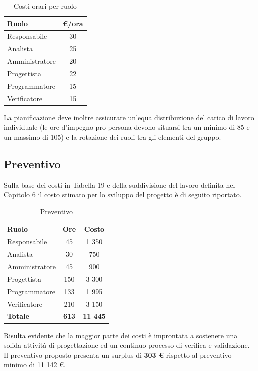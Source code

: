 \documentclass[a4paper,11pt]{article}
\begin{document}
	\begin{table}[h!]
	\begin{center}
		\begin{tabularx}{150pt}{Xc}
			\textbf{Ruolo} & \textbf{\euro/ora}\\
			\midrule
			Responsabile & 30 \\
			Analista & 25 \\
			Amministratore & 20 \\
			Progettista & 22 \\
			Programmatore & 15 \\
			Verificatore & 15 \\
			\midrule
		\end{tabularx}
		\end{center}
	\caption{Costi orari per ruolo}
	\end{table}
	
La pianificazione deve inoltre assicurare un'equa distribuzione del carico di lavoro individuale (le ore d'impegno pro persona devono situarsi tra un minimo di 85 e un massimo di 105) e la rotazione dei ruoli tra gli elementi del gruppo.
	\subsection{Preventivo}
	Sulla base dei costi in Tabella 19 e della suddivisione del lavoro definita nel Capitolo 6 il costo stimato per lo sviluppo del progetto è di seguito riportato.
	\begin{table}[h!]
	\begin{center}
		\begin{tabular}{l c c}
			\textbf{Ruolo} & \textbf{Ore} & \textbf{Costo}\\
			\midrule
			Responsabile & 45 & 1 350\\
			Analista & 30 & 750\\
			Amministratore & 45 & 900\\
			Progettista & 150 & 3 300\\
			Programmatore & 133 & 1 995\\
			Verificatore & 210 & 3 150\\
			\midrule
			\textbf{Totale} & \textbf{613} & \textbf{11 445}
		\end{tabular}
		\end{center}
	\caption{Preventivo}
	\end{table}
	
	Risulta evidente che la maggior parte dei costi è improntata a sostenere una solida attività di progettazione ed un continuo processo di verifica e validazione. Il preventivo proposto presenta un surplus di \textbf{303 \euro} rispetto al preventivo minimo di 11 142 \euro.
\end{document}
